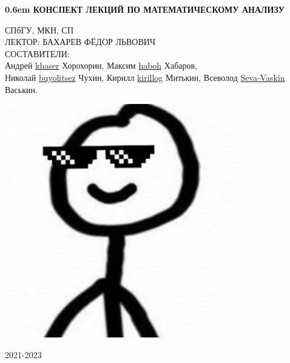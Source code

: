 \documentclass[12pt,letterpaper]{report}
\begin{document}
\clearpage
\newcommand\nbvspace[1][3]{\vspace*{\stretch{#1}}}
\newcommand\nbstretchyspace{\spaceskip0.5em plus 0.25em minus 0.25em}
\newcommand{\nbtitlestretch}{\spaceskip0.6em}
\pagestyle{empty}
\begin{center}
\bfseries
\nbvspace[1]
\Huge
{\nbtitlestretch\huge
КОНСПЕКТ ЛЕКЦИЙ ПО МАТЕМАТИЧЕСКОМУ АНАЛИЗУ}

\nbvspace[1]
\normalsize

СПбГУ, МКН, СП\\
ЛЕКТОР: БАХАРЕВ ФЁДОР ЛЬВОВИЧ
\nbvspace[1]
\\
\Large СОСТАВИТЕЛИ:\\[0.5em]
\footnotesize 
Андрей \href{https://github.com/khaser}{khaser} Хорохорин, 
Максим \href{https://github.com/haboh}{haboh} Хабаров,\\ 
Николай \href{https://github.com/buyolitsez}{buyolitsez} Чухин,
Кирилл \href{https://github.com/Kirillog}{kirillog} Митькин,
Всеволод \href{https://github.com/Seva-Vaskin}{Seva-Vaskin} Васькин.

\nbvspace[2]

\includegraphics[width=4.0in]{./images/logo.jpeg}
\nbvspace[3]
\normalsize

\large
2021-2023
\nbvspace[1]
\end{center}
\newpage
\pagestyle{plain}
\fi
\end{document}

